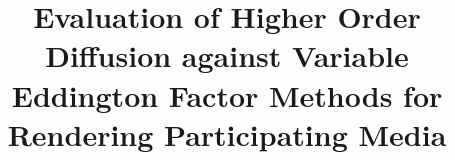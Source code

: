 

\title[Draft]%
{Evaluation of Higher Order Diffusion against Variable Eddington Factor Methods for Rendering Participating Media}




%





\maketitle


